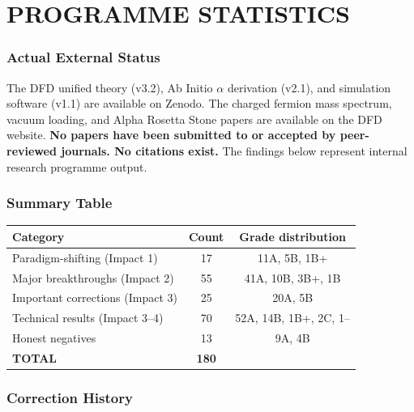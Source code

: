 \documentclass[11pt,a4paper]{article}
\begin{document}
\part{PROGRAMME STATISTICS}
\label{part:stats}

\section{Actual External Status}

\begin{tcolorbox}[colback=red!5!white,colframe=red!75!black,title=HONEST EXTERNAL STATUS]
The DFD unified theory (v3.2), Ab Initio $\alpha$ derivation (v2.1), and simulation software (v1.1) are available on Zenodo. The charged fermion mass spectrum, vacuum loading, and Alpha Rosetta Stone papers are available on the DFD website. \textbf{No papers have been submitted to or accepted by peer-reviewed journals. No citations exist.} The findings below represent internal research programme output.
\end{tcolorbox}

\section{Summary Table}

\begin{center}
\begin{tabular}{lcc}
\toprule
\textbf{Category} & \textbf{Count} & \textbf{Grade distribution} \\
\midrule
Paradigm-shifting (Impact 1) & 17 & 11A, 5B, 1B+ \\
Major breakthroughs (Impact 2) & 55 & 41A, 10B, 3B+, 1B \\
Important corrections (Impact 3) & 25 & 20A, 5B \\
Technical results (Impact 3--4) & 70 & 52A, 14B, 1B+, 2C, 1-- \\
Honest negatives & 13 & 9A, 4B \\
\midrule
\textbf{TOTAL} & \textbf{180} & \\
\bottomrule
\end{tabular}
\end{center}

\section{Correction History}
\end{document}
